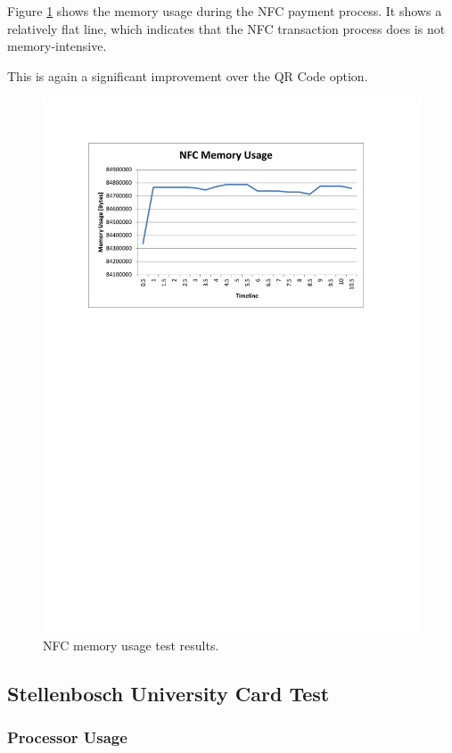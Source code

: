 Figure \ref{fig:nfc_test_mem} shows the memory usage during the NFC payment process. It
shows a relatively flat line, which indicates that the NFC transaction process does is not
memory-intensive. 

This is again a significant improvement over the QR Code option. 

\begin{figure}
 \centering 
 \includegraphics[clip=true, trim = 0 510 0 70,
 scale=0.7]{nfc_test_mem}
 \caption{NFC memory usage test results.}
 \label{fig:nfc_test_mem}
\end{figure}

\subsection{Stellenbosch University Card Test}

\subsubsection{Processor Usage}

